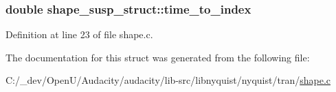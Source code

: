 \subsubsection[{\texorpdfstring{time\+\_\+to\+\_\+index}{time_to_index}}]{\setlength{\rightskip}{0pt plus 5cm}double shape\+\_\+susp\+\_\+struct\+::time\+\_\+to\+\_\+index}\hypertarget{structshape__susp__struct_a59b8a1c2f83042c0910c11f0716983cf}{}\label{structshape__susp__struct_a59b8a1c2f83042c0910c11f0716983cf}


Definition at line 23 of file shape.\+c.



The documentation for this struct was generated from the following file\+:\begin{DoxyCompactItemize}
\item 
C\+:/\+\_\+dev/\+Open\+U/\+Audacity/audacity/lib-\/src/libnyquist/nyquist/tran/\hyperlink{shape_8c}{shape.\+c}\end{DoxyCompactItemize}
